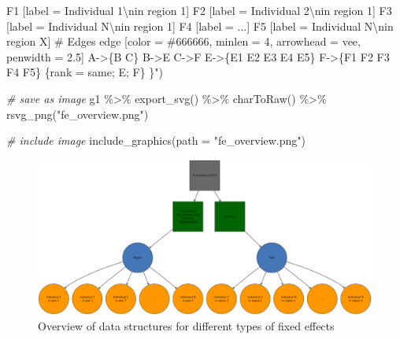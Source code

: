\documentclass[
]{article}
\newenvironment{Shaded}{\begin{snugshade}}{\end{snugshade}}
\newcommand{\AttributeTok}[1]{\textcolor[rgb]{0.77,0.63,0.00}{#1}}
\newcommand{\CommentTok}[1]{\textcolor[rgb]{0.56,0.35,0.01}{\textit{#1}}}
\newcommand{\FunctionTok}[1]{\textcolor[rgb]{0.00,0.00,0.00}{#1}}
\newcommand{\NormalTok}[1]{#1}
\newcommand{\SpecialCharTok}[1]{\textcolor[rgb]{0.00,0.00,0.00}{#1}}
\newcommand{\StringTok}[1]{\textcolor[rgb]{0.31,0.60,0.02}{#1}}
\begin{document}
\begin{Shaded}
\begin{Highlighting}[]
\StringTok{      F1 [label = \textquotesingle{}Individual 1}\SpecialCharTok{\textbackslash{}n}\StringTok{in region 1\textquotesingle{}]}
\StringTok{      F2 [label = \textquotesingle{}Individual 2}\SpecialCharTok{\textbackslash{}n}\StringTok{in region 1\textquotesingle{}]}
\StringTok{      F3 [label = \textquotesingle{}Individual N}\SpecialCharTok{\textbackslash{}n}\StringTok{in region 1\textquotesingle{}]}
\StringTok{      F4 [label = \textquotesingle{}...\textquotesingle{}]}
\StringTok{      F5 [label = \textquotesingle{}Individual N}\SpecialCharTok{\textbackslash{}n}\StringTok{in region X\textquotesingle{}]}
\StringTok{      \# Edges}
\StringTok{       edge [color = \textquotesingle{}\#666666\textquotesingle{}, minlen = 4, arrowhead = vee, penwidth = 2.5]}
\StringTok{      A{-}\textgreater{}\{B C\}}
\StringTok{      B{-}\textgreater{}E}
\StringTok{      C{-}\textgreater{}F}
\StringTok{      E{-}\textgreater{}\{E1 E2 E3 E4 E5\}}
\StringTok{      F{-}\textgreater{}\{F1 F2 F3 F4 F5\}}
\StringTok{   \{rank = same; E; F\}}
\StringTok{    \}"}\NormalTok{)}

\CommentTok{\# save as image }
\NormalTok{g1 }\SpecialCharTok{\%\textgreater{}\%}
  \FunctionTok{export\_svg}\NormalTok{() }\SpecialCharTok{\%\textgreater{}\%}
  \FunctionTok{charToRaw}\NormalTok{() }\SpecialCharTok{\%\textgreater{}\%}
  \FunctionTok{rsvg\_png}\NormalTok{(}\StringTok{"fe\_overview.png"}\NormalTok{)}

\CommentTok{\# include image }
\FunctionTok{include\_graphics}\NormalTok{(}\AttributeTok{path =} \StringTok{"fe\_overview.png"}\NormalTok{)}
\end{Highlighting}
\end{Shaded}

\begin{figure}
\includegraphics[width=1\linewidth]{fe_overview} \caption{Overview of data structures for different types of fixed effects}\label{fig:fe-representation-data-structure}
\end{figure}
\end{document}
